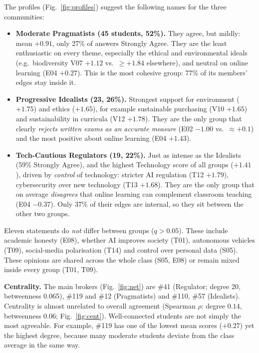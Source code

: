 \documentclass[11pt,a4paper]{article}
\begin{document}
The profiles (Fig.~\ref{fig:profiles}) suggest the following names for the three communities:
\begin{itemize}
\item \textbf{Moderate Pragmatists (45 students, 52\%).} They agree, but mildly: mean $+0.91$, only 27\% of answers
Strongly Agree. They are the least enthusiastic on every theme, especially the ethical and environmental ideals
(e.g.\ biodiversity V07 $+1.12$ vs.\ $\geq+1.84$ elsewhere), and neutral on online learning (E04 $+0.27$).
This is the most cohesive group: 77\% of its members' edges stay inside it.
\item \textbf{Progressive Idealists (23, 26\%).} Strongest support for environment ($+1.75$) and ethics ($+1.65$), for example
sustainable purchasing (V10 $+1.65$) and sustainability in curricula (V12 $+1.78$). They are the only group that clearly
\emph{rejects written exams as an accurate measure} (E02 $-1.00$ vs.\ $\approx+0.1$) and the most positive about
online learning (E04 $+1.43$).
\item \textbf{Tech-Cautious Regulators (19, 22\%).} Just as intense as the Idealists (59\% Strongly Agree), and the
highest Technology score of all groups ($+1.41$), driven by \emph{control} of technology: stricter AI regulation (T12 $+1.79$),
cybersecurity over new technology (T13 $+1.68$). They are the only group that on average \emph{disagrees} that online learning can
complement classroom teaching (E04 $-0.37$). Only 37\% of their edges are internal, so they sit between the other two groups.
\end{itemize}
Eleven statements do \emph{not} differ between groups ($q>0.05$). These include academic honesty (E08), whether AI improves society (T01),
autonomous vehicles (T09), social-media polarisation (T14) and control over personal data (S05). These opinions are shared across the
whole class (S05, E08) or remain mixed inside every group (T01, T09).

\textbf{Centrality.} The main brokers (Fig.~\ref{fig:net}) are \#41 (Regulator; degree 20, betweenness 0.065),
\#119 and \#12 (Pragmatists) and \#110, \#57 (Idealists). Centrality is almost unrelated to overall agreement
(Spearman $\rho$: degree $0.14$, betweenness $0.06$; Fig.~\ref{fig:cent}). Well-connected students are not simply the most
agreeable. For example, \#119 has one of the lowest mean scores ($+0.27$) yet the highest degree, because many
moderate students deviate from the class average in the same way.
\end{document}
